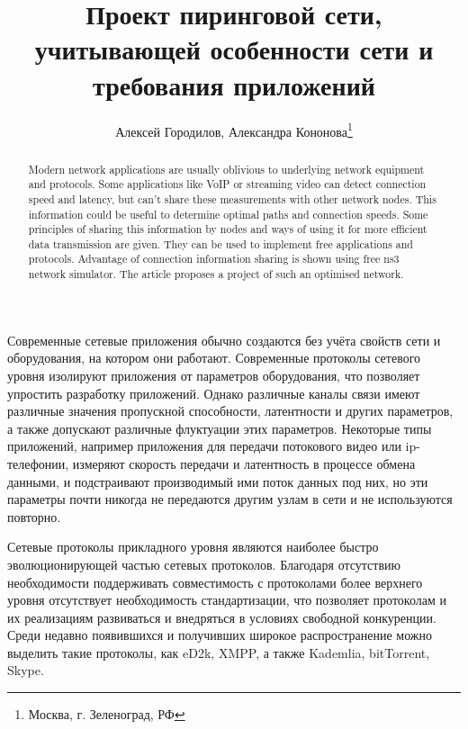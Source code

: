 \documentclass[10pt, a5paper]{article}
\begin{document}
\title{Проект пиринговой сети, учитывающей особенности сети и требования приложений}%

\author{Алексей Городилов, Александра Кононова\footnote{Москва, г. Зеленоград, РФ}}
\maketitle

\begin{abstract}
Modern network applications are usually oblivious to underlying network equipment and protocols. Some applications like VoIP or streaming video can detect connection speed and latency, but can't share these measurements with other network nodes. This information could be useful to determine optimal paths and connection speeds. Some principles of sharing this information by nodes and ways of using it for more efficient data transmission are given. They can be used to implement free applications and protocols. Advantage of connection information sharing is shown using free ns3 network simulator. The article proposes a project of such an optimised network.
\end{abstract}

Современные сетевые приложения обычно создаются без учёта свойств сети и оборудования, на котором они работают.  Современные протоколы сетевого уровня изолируют приложения от параметров оборудования, что позволяет упростить разработку приложений. Однако различные каналы связи имеют различные значения пропускной способности, латентности и других параметров, а также допускают различные флуктуации этих параметров. Некоторые типы приложений, например приложения для передачи потокового видео или ip-телефонии, измеряют скорость передачи и латентность в процессе обмена данными, и подстраивают производимый ими поток данных под них, но эти параметры почти никогда не передаются другим узлам в сети и не используются повторно.

Сетевые протоколы прикладного уровня являются наиболее \linebreak быстро эволюционирующей частью сетевых протоколов. Благодаря отсутствию необходимости поддерживать совместимость с протоколами более верхнего уровня отсутствует необходимость стандартизации, что позволяет протоколам и их реализациям развиваться и внедряться в условиях свободной конкуренции. Среди недавно появившихся и получивших широкое распространение можно выделить такие протоколы, как eD2k, XMPP, а также Kademlia, bitTorrent, Skype.
\end{document}
